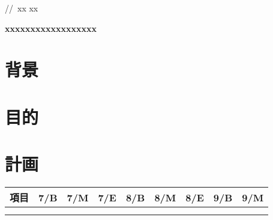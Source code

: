 \documentclass[11pt,a4paper,uplatex]{jsarticle}
\newcommand{\todayd}{\the\year/\the\month/\the\day}
\begin{document}
	\noindent \hfill  \todayd\ xx xx
	\begin{center}
		\LARGE\textbf{xxxxxxxxxxxxxxxxxx}
	\end{center}
	\section{背景}
	
	\section{目的}
	
	\section{計画}
	
	\begin{center}
		\begin{table}[h]
			\begin{tabular}{|p{43mm}|p{7.25mm}|p{7.25mm}|p{7.25mm}|p{7.25mm}|p{7.25mm}|p{7.25mm}|p{7.25mm}|p{7.25mm}|}
				\hline
				\hfil 項目 \hfil& \hfil 7/B \hfil & \hfil 7/M \hfil & \hfil 7/E \hfil & \hfil 8/B \hfil & \hfil 8/M \hfil & \hfil 8/E \hfil & \hfil 9/B \hfil & \hfil 9/M \hfil \\ \hline
				&     &     &     &     &     &     &     &     \\ \hline
				&     &     &     &     &     & 	&     &     \\ \hline
			\end{tabular}
		\end{table}
	\end{center}
\end{document}
